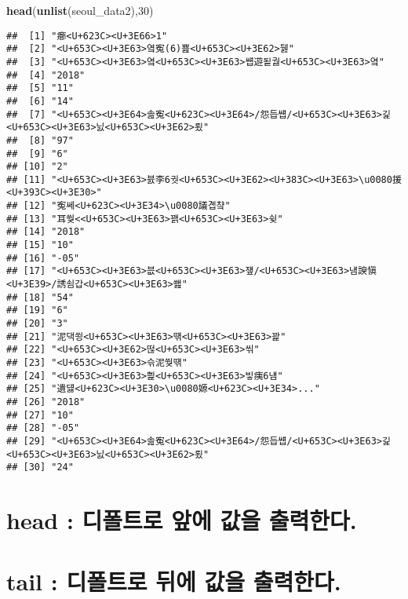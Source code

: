 \documentclass[]{article}
\newenvironment{Shaded}{\begin{snugshade}}{\end{snugshade}}
\newcommand{\KeywordTok}[1]{\textcolor[rgb]{0.13,0.29,0.53}{\textbf{#1}}}
\newcommand{\DecValTok}[1]{\textcolor[rgb]{0.00,0.00,0.81}{#1}}
\newcommand{\NormalTok}[1]{#1}
\begin{document}
\begin{Shaded}
\begin{Highlighting}[]
\KeywordTok{head}\NormalTok{(}\KeywordTok{unlist}\NormalTok{(seoul_data2),}\DecValTok{30}\NormalTok{)}
\end{Highlighting}
\end{Shaded}

\begin{verbatim}
##  [1] "癤<U+623C><U+3E66>1"                   
##  [2] "<U+653C><U+3E63>옄寃(6)뾾<U+653C><U+3E62>뒗"
##  [3] "<U+653C><U+3E63>옄<U+653C><U+3E63>썝遊됱궗<U+653C><U+3E63>옄"
##  [4] "2018"                                  
##  [5] "11"                                    
##  [6] "14"                                    
##  [7] "<U+653C><U+3E64>솚寃<U+623C><U+3E64>/怨듭썝/<U+653C><U+3E63>긽<U+653C><U+3E63>닔<U+653C><U+3E62>룄"
##  [8] "97"                                    
##  [9] "6"                                     
## [10] "2"                                     
## [11] "<U+653C><U+3E63>븘李6궛<U+653C><U+3E62><U+383C><U+3E63>\u0080援<U+393C><U+3E30>"
## [12] "寃쎄<U+623C><U+3E34>\u0080議곕챸"      
## [13] "耳쒖<<U+653C><U+3E63>꽭<U+653C><U+3E63>슂"
## [14] "2018"                                  
## [15] "10"                                    
## [16] "-05"                                   
## [17] "<U+653C><U+3E63>븞<U+653C><U+3E63>쟾/<U+653C><U+3E63>냼諛愼<U+3E39>/誘쇰갑<U+653C><U+3E63>쐞"
## [18] "54"                                    
## [19] "6"                                     
## [20] "3"                                     
## [21] "泥댁쑁<U+653C><U+3E63>떆<U+653C><U+3E63>꽕"
## [22] "<U+653C><U+3E62>떦<U+653C><U+3E63>씪"  
## [23] "<U+653C><U+3E63>슦泥쒖떆"              
## [24] "<U+653C><U+3E63>삁<U+653C><U+3E63>빟痍6냼"
## [25] "遺덇<U+623C><U+3E30>\u0080嫄<U+623C><U+3E34>..."
## [26] "2018"                                  
## [27] "10"                                    
## [28] "-05"                                   
## [29] "<U+653C><U+3E64>솚寃<U+623C><U+3E64>/怨듭썝/<U+653C><U+3E63>긽<U+653C><U+3E63>닔<U+653C><U+3E62>룄"
## [30] "24"
\end{verbatim}

\section{head : 디폴트로 앞에 값을 출력한다.}\label{head----.}

\section{tail : 디폴트로 뒤에 값을 출력한다.}\label{tail----.}
\end{document}
